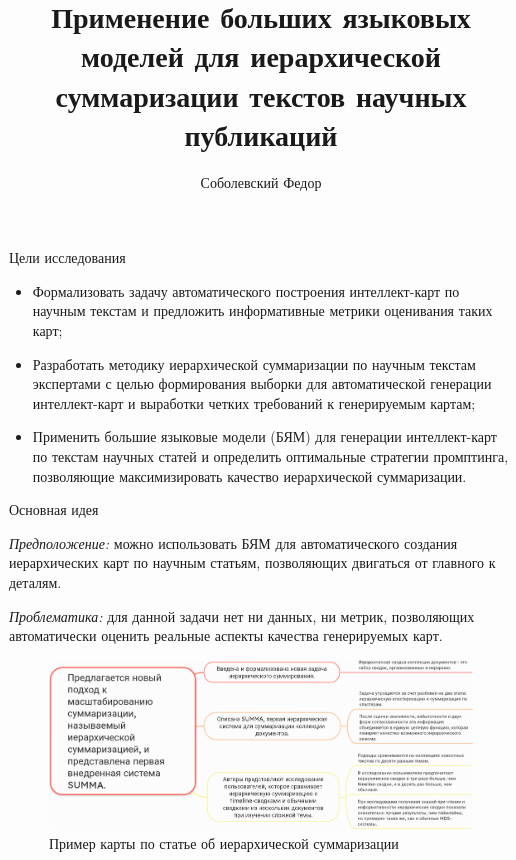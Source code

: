 \documentclass{beamer}
\title[\hbox to 56mm{Тензорное непрерывное представление сигнала}]{Применение больших языковых моделей для иерархической суммаризации текстов научных публикаций}
\author[Ф.\,А.~Соболевский]{Соболевский Федор}
\institute{Московский физико-технический институт}
\date{\footnotesize
\par\smallskip Кафедра интеллектуальных систем ФПМИ МФТИ
\par\smallskip\emph{Научный руководитель:} д.\,ф.-м.\,н. К.\,В.~Воронцов
\par\bigskip\small 2024}
\begin{document}

\begin{frame}
\thispagestyle{empty}
\maketitle
\end{frame}


\begin{frame}{Цели исследования}
\begin{itemize}
    \item Формализовать задачу автоматического построения интеллект-карт по научным текстам и предложить информативные метрики оценивания таких карт;
    
    \item Разработать методику иерархической суммаризации по научным текстам экспертами с целью формирования выборки для автоматической генерации интеллект-карт и выработки четких требований к генерируемым картам;
    
    \item Применить большие языковые модели (БЯМ) для генерации интеллект-карт по текстам научных статей и определить оптимальные стратегии промптинга, позволяющие максимизировать качество иерархической суммаризации.
\end{itemize}
\end{frame}


\begin{frame}{Основная идея}

\emph{Предположение:} можно использовать БЯМ для автоматического создания иерархических карт по научным статьям, позволяющих двигаться от главного к деталям. 

\emph{Проблематика:} для данной задачи нет ни данных, ни метрик, позволяющих автоматически оценить реальные аспекты качества генерируемых карт. 

\begin{figure}
    \centering
    \includegraphics[width=0.8\linewidth]{img/example_map.png}
    \caption{Пример карты по статье об иерархической суммаризации}
    \label{fig:example_map}
\end{figure}


\end{frame}
\end{document}
